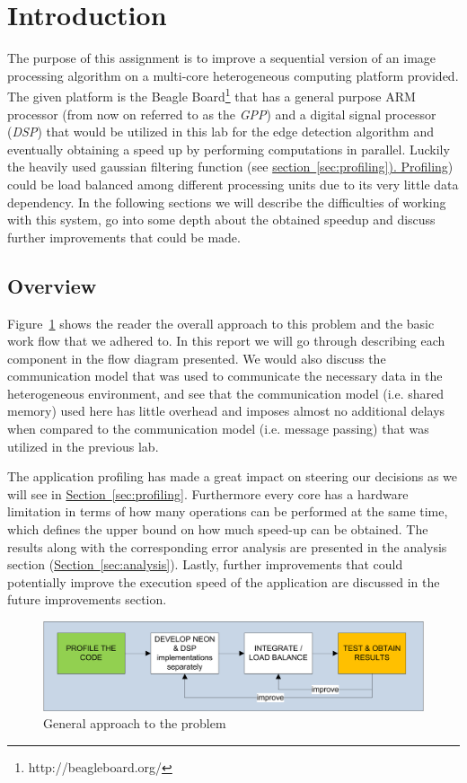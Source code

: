 \section{Introduction}

The purpose of this assignment is to improve a sequential version of an image processing algorithm on a multi-core heterogeneous computing platform provided. The given platform is the Beagle Board\footnote{http://beagleboard.org/} that has a general purpose ARM processor (from now on referred to as the \emph{GPP}) and a digital signal processor (\emph{DSP}) that would be utilized in this lab for the edge detection algorithm and eventually obtaining a speed up by performing computations in parallel. Luckily the heavily used gaussian filtering function (see \hyperref[sec:profiling]{section~\ref{sec:profiling}). Profiling}) could be load balanced among different processing units due to its very little data dependency. In the following sections we will describe the difficulties of working with this system, go into some depth about the obtained speedup and discuss further improvements that could be made.

\subsection{Overview}
Figure~\ref{fig:workflow} shows the reader the overall approach to this problem and the basic work flow that we adhered to. In this report we will go through describing each component in the flow diagram presented. We would also discuss the communication model that was used to communicate the necessary data in the heterogeneous environment, and see that the communication model (i.e. shared memory) used here has little overhead and imposes almost no additional delays when compared to the communication model (i.e. message passing) that was utilized in the previous lab.

The application profiling has made a great impact on steering our decisions as we will see in \hyperref[sec:profiling]{Section~\ref{sec:profiling}}. Furthermore every core has a hardware limitation in terms of how many operations can be performed at the same time, which defines the upper bound on how much speed-up can be obtained. The results along with the corresponding error analysis are presented in the analysis section (\hyperref[sec:analysis]{Section~\ref{sec:analysis}}). Lastly, further improvements that could potentially improve the execution speed of the application are discussed in the future improvements section.

\begin{figure}
\includegraphics[width=\linewidth]{drawings/workflow}
\caption{General approach to the problem}
\label{fig:workflow}
\end{figure}


